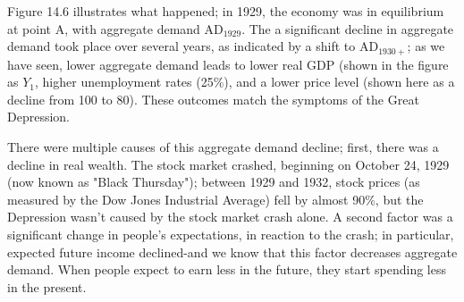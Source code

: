 \documentclass[11pt]{article} %
\begin{document}
Figure 14.6 illustrates what happened; in 1929, the economy was in equilibrium at point A, with aggregate demand \(\text{AD}_{1929}\). The a significant decline in aggregate demand took place over several years, as indicated by a shift to \(\text{AD}_{1930+}\); as we have seen, lower aggregate demand leads to lower real GDP (shown in the figure as \(Y_1\), higher unemployment rates (25\%), and a lower price level (shown here as a decline from 100 to 80). These outcomes match the symptoms of the Great Depression.

There were multiple causes of this aggregate demand decline; first, there was a decline in real wealth. The stock market crashed, beginning on October 24, 1929 (now known as "Black Thursday"); between 1929 and 1932, stock prices (as measured by the Dow Jones Industrial Average) fell by almost 90\%, but the Depression wasn't caused by the stock market crash alone. A second factor was a significant change in people's expectations, in reaction to the crash; in particular, expected future income declined-and we know that this factor decreases aggregate demand. When people expect to earn less in the future, they start spending less in the present.
\end{document}
